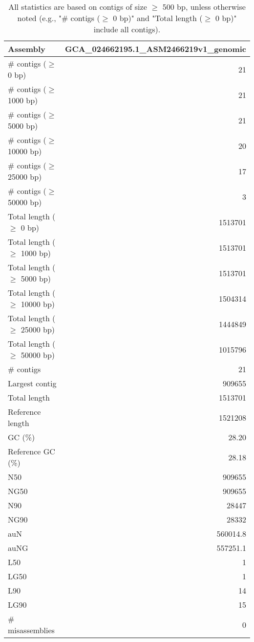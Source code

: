 \documentclass[12pt,a4paper]{article}
\begin{document}
\begin{table}[ht]
\begin{center}
\caption{All statistics are based on contigs of size $\geq$ 500 bp, unless otherwise noted (e.g., "\# contigs ($\geq$ 0 bp)" and "Total length ($\geq$ 0 bp)" include all contigs).}
\begin{tabular}{|l*{1}{|r}|}
\hline
Assembly & GCA\_024662195.1\_ASM2466219v1\_genomic \\ \hline
\# contigs ($\geq$ 0 bp) & 21 \\ \hline
\# contigs ($\geq$ 1000 bp) & 21 \\ \hline
\# contigs ($\geq$ 5000 bp) & 21 \\ \hline
\# contigs ($\geq$ 10000 bp) & 20 \\ \hline
\# contigs ($\geq$ 25000 bp) & 17 \\ \hline
\# contigs ($\geq$ 50000 bp) & 3 \\ \hline
Total length ($\geq$ 0 bp) & 1513701 \\ \hline
Total length ($\geq$ 1000 bp) & 1513701 \\ \hline
Total length ($\geq$ 5000 bp) & 1513701 \\ \hline
Total length ($\geq$ 10000 bp) & 1504314 \\ \hline
Total length ($\geq$ 25000 bp) & 1444849 \\ \hline
Total length ($\geq$ 50000 bp) & 1015796 \\ \hline
\# contigs & 21 \\ \hline
Largest contig & 909655 \\ \hline
Total length & 1513701 \\ \hline
Reference length & 1521208 \\ \hline
GC (\%) & 28.20 \\ \hline
Reference GC (\%) & 28.18 \\ \hline
N50 & 909655 \\ \hline
NG50 & 909655 \\ \hline
N90 & 28447 \\ \hline
NG90 & 28332 \\ \hline
auN & 560014.8 \\ \hline
auNG & 557251.1 \\ \hline
L50 & 1 \\ \hline
LG50 & 1 \\ \hline
L90 & 14 \\ \hline
LG90 & 15 \\ \hline
\# misassemblies & 0 \\ \hline

\end{tabular}
\end{center}
\end{table}
\end{document}
